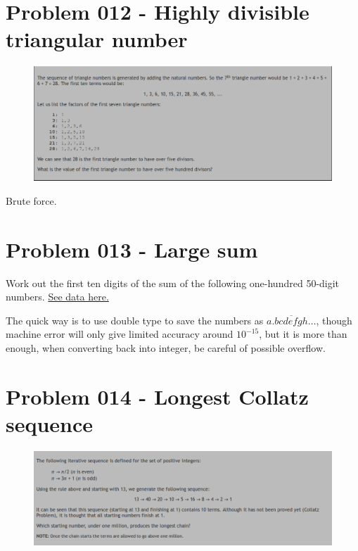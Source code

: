 \section{Problem 012 - Highly divisible triangular number}
\begin{prob}
\begin{figure}[htb!]
\includegraphics[scale = 0.4]{pic/012.png}
\end{figure}
\end{prob}
\begin{sol}
Brute force.
\end{sol}

\section{Problem 013 - Large sum}
\begin{prob}
Work out the first ten digits of the sum of the following one-hundred 50-digit numbers. \href{https://projecteuler.net/problem=13}{See data here.}
\end{prob}
\begin{sol}
The quick way is to use double type to save the numbers as $\overline{a.bcdefgh\dots}$, though machine error will only give limited accuracy around $10^{-15}$, but it is more than enough, when converting back into integer, be careful of possible overflow.
\end{sol}
\newpage
\section{Problem 014 - Longest Collatz sequence}
\begin{prob}
	\begin{figure}[htb!]
		\begin{center}
			\includegraphics[scale = 0.4]{pic/014.png}
		\end{center}
	\end{figure}
\end{prob}

